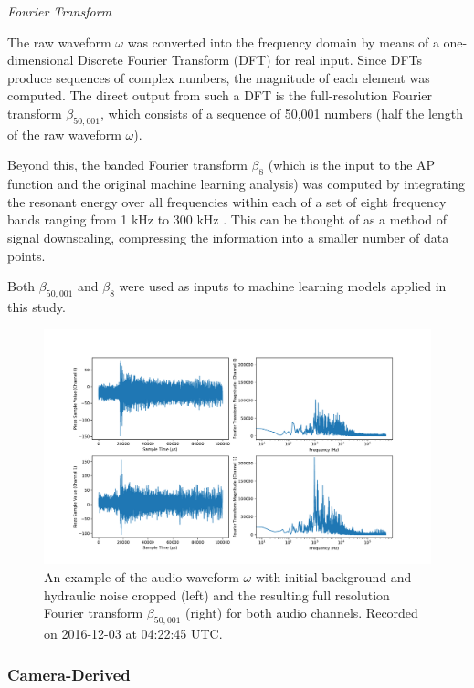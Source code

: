 \documentclass[10pt]{article}
\begin{document}
\textit{Fourier Transform}

The raw waveform $\omega$ was converted into the frequency domain by means of a one-dimensional Discrete Fourier Transform (DFT) for real input. Since DFTs produce sequences of complex numbers, the magnitude of each element was computed. The direct output from such a DFT is the full-resolution Fourier transform $\beta _{50,001}$, which consists of a sequence of 50,001 numbers (half the length of the raw waveform $\omega$).

Beyond this, the banded Fourier transform $\beta_{8}$ (which is the input to the AP function and the original machine learning analysis) was computed by integrating the resonant energy over all frequencies within each of a set of eight frequency bands ranging from 1 kHz to 300 kHz \cite{pico}. This can be thought of as a method of signal downscaling, compressing the information into a smaller number of data points.

Both $\beta _{50,001}$ and $\beta_{8}$ were used as inputs to machine learning models applied in this study.

\begin{figure}[h]
    \centering
    \includegraphics[width=\textwidth]{audio}
    \caption{\label{} An example of the audio waveform $\omega$ with initial background and hydraulic noise cropped (left) and the resulting full resolution Fourier transform $\beta_{50,001}$ (right) for both audio channels. Recorded on 2016-12-03 at 04:22:45 UTC.}
\end{figure}

\subsubsection{Camera-Derived} \label{camera_derived}
\end{document}
